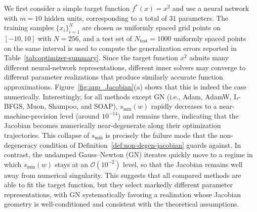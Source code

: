\documentclass[twoside,11pt]{article}
\begin{document}
We first consider a simple target function $f^*(x)=x^2$ and use a neural network with $m=10$ hidden units, corresponding to a total of $31$ parameters. The training samples $\{x_i\}_{i=1}^N$ are chosen as uniformly spaced grid points on $[-10,10]$ with $N=256$, and a test set of $N_{\mathrm{test}}=1000$ uniformly spaced points on the same interval is used to compute the generalization errors reported in Table~\ref{tab:optimizer-summary}. Since the target function $x^2$ admits many different neural-network representations, different inner solvers may converge to different parameter realizations that produce similarly accurate function approximations. Figure~\ref{fig:app_Jacobian}(a) shows that this is indeed the case numerically. Interestingly, for all methods except GN (i.e., Adam, AdamW, L-BFGS, Muon, Shampoo, and SOAP), $s_{\min}(w)$ rapidly decreases to a near-machine-precision level (around $10^{-14}$) and remains there, indicating that the Jacobian becomes numerically near-degenerate along their optimization trajectories. This collapse of $s_{\min}$ is precisely the failure mode that the non-degeneracy condition of Definition~\ref{def:non-degen-jacobian} guards against. In contrast, the undamped Gauss--Newton (GN) iterates quickly move to a regime in which $s_{\min}(w)$ stays at an $\mathcal{O}(10^{-2})$ level, so that the Jacobian remains well away from numerical singularity. This suggests that all compared methods are able to fit the target function, but they select markedly different parameter representations, with GN systematically favoring a realization whose Jacobian geometry is well-conditioned and consistent with the theoretical assumptions.








\end{document}
